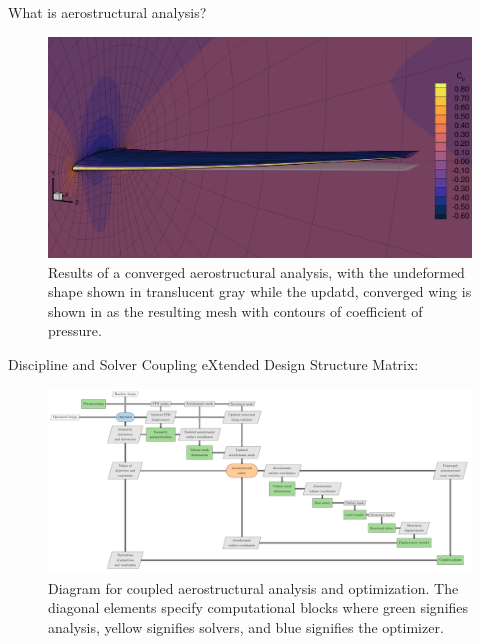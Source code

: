 \documentclass{bredelebeamer}
\begin{document}
\begin{frame}{What is aerostructural analysis?}
\begin{figure}
\includegraphics[width=1.05\linewidth]{images/aerostruct-resultDeformed.png} 
\caption{Results of a converged aerostructural analysis, with the undeformed shape shown in translucent gray while the updatd, converged wing is shown in as the resulting mesh with contours of coefficient of pressure.}
\end{figure}
\end{frame}

\begin{frame}{Discipline and Solver Coupling}
  eXtended Design Structure Matrix:
  \begin{figure}
    \includegraphics[width=1.0\linewidth]{images/aerostruct-xdsm.pdf} 
    \caption{Diagram for coupled aerostructural analysis and optimization. The diagonal elements specify computational blocks where green signifies analysis, yellow signifies solvers, and blue signifies the optimizer.}
  \end{figure}
\end{frame}
\end{document}
